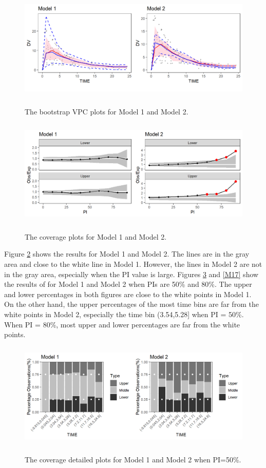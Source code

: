 \begin{figure}
\caption{The bootstrap VPC plots for Model 1 and Model 2.}
\centering
 \includegraphics[width=5in,height=2in]{plotPNG/M14-1.png}
\label{M14}
\end{figure}


\begin{figure}
\caption{The coverage plots for Model 1 and Model 2.}
\centering
\includegraphics[width=5in,height=2in]{plotPNG/M15-1.png}
\label{M15}
\end{figure}


Figure \ref{M15} shows the   results for Model 1 and Model 2. The lines are in the gray area and close to the white line in Model 1. However, the lines in Model 2 are not in the gray area, especially when the PI value is large. Figures \ref{M16} and \ref{M17} show the results of  for Model 1 and Model 2 when PIs are 50\% and 80\%.
The upper and lower percentages in both figures are close to the white points in Model 1. On the other hand, the upper percentages of the most time bins are far from the white points in Model 2, especially the time bin (3.54,5.28] when PI = 50\%. When PI = 80\%, most upper and lower percentages are far from the white points.

\begin{figure}
\caption{The coverage detailed plots for Model 1 and Model 2 when PI=50\%. }
\centering
\includegraphics[width=5in,height=2in]{plotPNG/M16-1.png}
\label{M16}
\end{figure}


